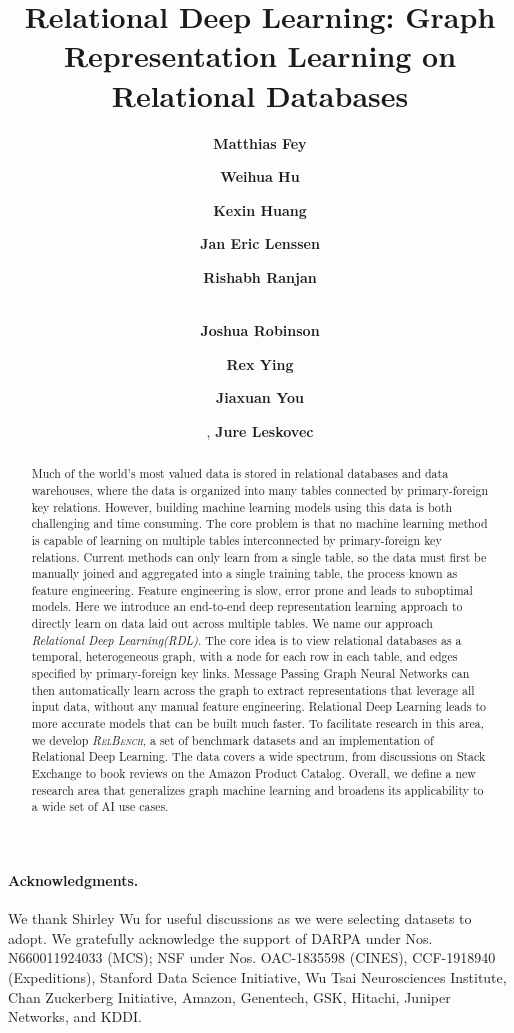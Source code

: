 \documentclass{article}
\title{Relational Deep Learning: Graph Representation Learning on Relational Databases}
\author[2,*]{\textbf{Matthias Fey}}
\author[2,*]{\textbf{Weihua Hu}}
\author[1,*]{\textbf{Kexin Huang}}
\author[2,3,*]{\textbf{Jan Eric Lenssen}}
\author[1,*]{\textbf{Rishabh Ranjan}}
\author[1,*]{\\\textbf{Joshua Robinson}}
\author[2,4]{\textbf{Rex Ying}}
\author[2,5]{\textbf{Jiaxuan You}}
\author[1,2]{, \textbf{Jure Leskovec}}
\affil[*]{Equal contribution. Listed in alphabetical order. \vspace{1em}}
\affil[1]{Stanford University}
\affil[2]{Kumo.AI}
\affil[3]{Max Planck Institute for Informatics}
\affil[4]{Yale University}
\affil[5]{University of Illinois at Urbana-Champaign \vspace{1em}}
\affil[ ]{\BenchmarkName: \href{https://relbench.stanford.edu/}{https://relbench.stanford.edu}}
\newcommand{\AreaName}{Relational Deep Learning\xspace}
\newcommand{\BenchmarkName}{\textsc{RelBench}\xspace}
\newcommand{\xhdr}[1]{\paragraph{#1.}\xspace} %
\begin{document}
\maketitle


\begin{abstract}
Much of the world's most valued data is stored in relational databases and data warehouses, where the data is organized into many tables connected by primary-foreign key relations. 
However, building machine learning models using this data is both challenging and time consuming. 
The core problem is that no machine learning method is capable of learning on multiple tables interconnected by primary-foreign key relations.
Current methods can only learn from a single table, so the data must first be manually joined and aggregated into a single training table, the process known as feature engineering. Feature engineering is slow, error prone and leads to suboptimal models.
%
Here we introduce an end-to-end deep representation learning approach to directly learn on data laid out across multiple tables. We name our approach {\em \AreaName (RDL)}.
%
The core idea is to view relational databases as a temporal, heterogeneous graph, with a node for each row in each table, and edges specified by primary-foreign key links. Message Passing Graph Neural Networks can then automatically learn across the graph to extract representations that leverage all input data, without any manual feature engineering. \AreaName leads to more accurate models that can be built much faster.
%
To facilitate research in this area, we develop {\em \BenchmarkName}, a set of benchmark datasets and an implementation of \AreaName. The data covers a wide spectrum, from discussions on Stack Exchange to book reviews on the Amazon Product Catalog.
%
Overall, we define a new research area that generalizes graph machine learning and broadens its applicability to a wide set of AI use cases.
\end{abstract}













\newpage

\xhdr{Acknowledgments}  We thank Shirley Wu for useful discussions as we were selecting datasets to adopt. We gratefully acknowledge the support of DARPA under Nos. N660011924033 (MCS); NSF under Nos. OAC-1835598 (CINES), CCF-1918940 (Expeditions), Stanford Data Science Initiative, Wu Tsai Neurosciences Institute, Chan Zuckerberg Initiative, Amazon, Genentech, GSK, Hitachi, Juniper Networks, and KDDI.



\end{document}
